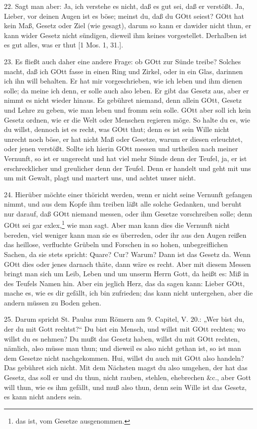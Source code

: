 22. Sagt man aber: Ja, ich verstehe es nicht, daß es gut sei, daß er verstößt. Ja, Lieber, vor deinen Augen ist es böse; meinst du, daß du GOtt seiest? GOtt hat kein Maß, Gesetz oder Ziel (wie gesagt), darum so kann er dawider nicht thun, er kann wider Gesetz nicht sündigen, dieweil ihm keines vorgestellet. Derhalben ist es gut alles, was er thut [1 Mos. 1, 31.].

23. Es fließt auch daher eine andere Frage: ob GOtt zur Sünde treibe? Solches macht, daß ich GOtt fasse in einen Ring und Zirkel, oder in ein Glas, darinnen ich ihn will behalten. Er hat mir vorgeschrieben, wie ich leben und ihm dienen solle; da meine ich denn, er solle auch also leben. Er gibt das Gesetz aus, aber er nimmt es nicht wieder hinaus. Es gebühret niemand, denn allein GOtt, Gesetz und Lehre zu geben, wie man leben und fromm sein solle. GOtt aber soll ich kein Gesetz ordnen, wie er die Welt oder Menschen regieren möge. So halte du es, wie du willst, dennoch ist es recht, was GOtt thut; denn es ist sein Wille nicht unrecht noch böse, er hat nicht Maß oder Gesetze, warum er diesen erleuchtet, oder jenen verstößt. Sollte ich hierin GOtt messen und urtheilen nach meiner Vernunft, so ist er ungerecht und hat viel mehr Sünde denn der Teufel, ja, er ist erschrecklicher und greulicher denn der Teufel. Denn er handelt und geht mit uns um mit Gewalt, plagt und martert uns, und achtet unser nicht.

24. Hierüber möchte einer thöricht werden, wenn er nicht seine Vernunft gefangen nimmt, und aus dem Kopfe ihm treiben läßt alle solche Gedanken, und beruht nur darauf, daß GOtt niemand messen, oder ihm Gesetze vorschreiben solle; denn GOtt sei gar exlex,\footnote{das ist, vom Gesetze ausgenommen.} wie man sagt. Aber man kann dies die Vernunft nicht bereden, viel weniger kann man sie es überreden, oder ihr aus den Augen reißen das heillose, verfluchte Grübeln und Forschen in so hohen, unbegreiflichen Sachen, da sie stets spricht: Quare? Cur? Warum? Dann ist das Gesetz da. Wenn GOtt dies oder jenes darnach thäte, dann wäre es recht. Aber mit diesem Messen bringt man sich um Leib, Leben und um unserm Herrn Gott, da heißt es: Miß in des Teufels Namen hin. Aber ein jeglich Herz, das da sagen kann: Lieber GOtt, mache es, wie es dir gefällt, ich bin zufrieden; das kann nicht untergehen, aber die andern müssen zu Boden gehen.

25. Darum spricht St. Paulus zum Römern am 9. Capitel, V. 20.: „Wer bist du, der du mit Gott rechtst?“ Du bist ein Mensch, und willst mit GOtt rechten; wo willst du es nehmen? Du mußt das Gesetz haben, willst du mit GOtt rechten, nämlich, also müsse man thun; und dieweil es also nicht gethan ist, so ist man dem Gesetze nicht nachgekommen. Hui, willst du auch mit GOtt also handeln? Das gebühret sich nicht. Mit dem Nächsten magst du also umgehen, der hat das Gesetz, das soll er und du thun, nicht rauben, stehlen, ehebrechen \&c., aber Gott will thun, wie es ihm gefällt, und muß also thun, denn sein Wille ist das Gesetz, es kann nicht anders sein.

